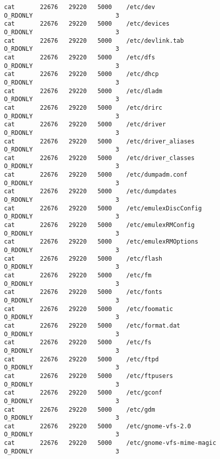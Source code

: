 \documentclass[a4paper]{article}
\begin{document}
\begin{lstlisting}[style=esc]
cat       22676   29220   5000    /etc/dev                       O_RDONLY                       3
cat       22676   29220   5000    /etc/devices                   O_RDONLY                       3
cat       22676   29220   5000    /etc/devlink.tab               O_RDONLY                       3
cat       22676   29220   5000    /etc/dfs                       O_RDONLY                       3
cat       22676   29220   5000    /etc/dhcp                      O_RDONLY                       3
cat       22676   29220   5000    /etc/dladm                     O_RDONLY                       3
cat       22676   29220   5000    /etc/drirc                     O_RDONLY                       3
cat       22676   29220   5000    /etc/driver                    O_RDONLY                       3
cat       22676   29220   5000    /etc/driver_aliases            O_RDONLY                       3
cat       22676   29220   5000    /etc/driver_classes            O_RDONLY                       3
cat       22676   29220   5000    /etc/dumpadm.conf              O_RDONLY                       3
cat       22676   29220   5000    /etc/dumpdates                 O_RDONLY                       3
cat       22676   29220   5000    /etc/emulexDiscConfig          O_RDONLY                       3
cat       22676   29220   5000    /etc/emulexRMConfig            O_RDONLY                       3
cat       22676   29220   5000    /etc/emulexRMOptions           O_RDONLY                       3
cat       22676   29220   5000    /etc/flash                     O_RDONLY                       3
cat       22676   29220   5000    /etc/fm                        O_RDONLY                       3
cat       22676   29220   5000    /etc/fonts                     O_RDONLY                       3
cat       22676   29220   5000    /etc/foomatic                  O_RDONLY                       3
cat       22676   29220   5000    /etc/format.dat                O_RDONLY                       3
cat       22676   29220   5000    /etc/fs                        O_RDONLY                       3
cat       22676   29220   5000    /etc/ftpd                      O_RDONLY                       3
cat       22676   29220   5000    /etc/ftpusers                  O_RDONLY                       3
cat       22676   29220   5000    /etc/gconf                     O_RDONLY                       3
cat       22676   29220   5000    /etc/gdm                       O_RDONLY                       3
cat       22676   29220   5000    /etc/gnome-vfs-2.0             O_RDONLY                       3
cat       22676   29220   5000    /etc/gnome-vfs-mime-magic      O_RDONLY                       3

\end{lstlisting}
\end{document}
